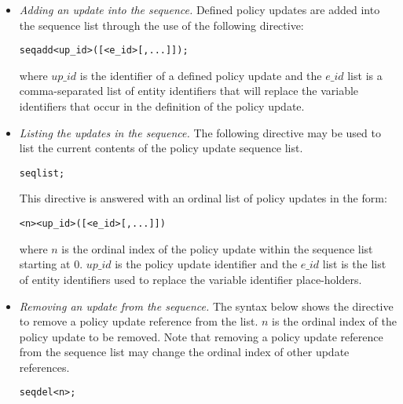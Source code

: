 \documentclass[global,twocolumn,final]{svjour}
\newenvironment{vverbatim}
  {\begin{alltt}}
  {\vspace{-\baselineskip}\end{alltt}}
\begin{document}
        \begin{itemize}
          \item
            {\em Adding an update into the sequence.}
            Defined policy updates are added into the sequence list through the
            use of the following directive:

            \begin{vverbatim}
  seq add <up\_id>([<e\_id>[, ...]]);
            \end{vverbatim}

            \noindent where $up\_id$ is the identifier of a defined policy
            update and the $e\_id$ list is a comma-separated list of entity
            identifiers that will replace the variable identifiers that occur in
            the definition of the policy update.

          \item
            {\em Listing the updates in the sequence.}
            The following directive may be used to list the current contents of
            the policy update sequence list.

            \begin{vverbatim}
  seq list;
            \end{vverbatim}

            This directive is answered with an ordinal list of policy updates
            in the form:

            \begin{vverbatim}
  <n> <up\_id>([<e\_id>[, ...]])
            \end{vverbatim}

            \noindent where $n$ is the ordinal index of the policy update
            within the sequence list starting at 0. $up\_id$ is the policy
            update identifier and the $e\_id$ list is the list of entity
            identifiers used to replace the variable identifier place-holders.

          \item
            {\em Removing an update from the sequence.}
            The syntax below shows the directive to remove a policy update
            reference from the list. $n$ is the ordinal index of the policy
            update to be removed. Note that removing a policy update reference
            from the sequence list may change the ordinal index of other update
            references.

            \begin{vverbatim}
  seq del <n>;
            \end{vverbatim}


\end{itemize}
\end{document}
